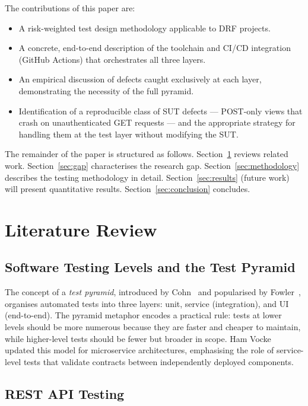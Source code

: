\documentclass[12pt, a4paper]{article}
\begin{document}
The contributions of this paper are:
\begin{itemize}
    \item A risk-weighted test design methodology applicable to DRF projects.
    \item A concrete, end-to-end description of the toolchain and CI/CD
    integration (GitHub Actions) that orchestrates all three layers.
    \item An empirical discussion of defects caught exclusively at each layer,
    demonstrating the necessity of the full pyramid.
    \item Identification of a reproducible class of SUT defects — POST-only
    views that crash on unauthenticated GET requests — and the appropriate
    strategy for handling them at the test layer without modifying the SUT.
\end{itemize}

The remainder of the paper is structured as follows.
Section~\ref{sec:literature} reviews related work.
Section~\ref{sec:gap} characterises the research gap.
Section~\ref{sec:methodology} describes the testing methodology in detail.
Section~\ref{sec:results} (future work) will present quantitative results.
Section~\ref{sec:conclusion} concludes.

\section{Literature Review}
\label{sec:literature}

\subsection{Software Testing Levels and the Test Pyramid}

The concept of a \textit{test pyramid}, introduced by Cohn~\cite{cohn2009} and
popularised by Fowler~\cite{fowler_pyramid}, organises automated tests into
three layers: unit, service (integration), and UI (end-to-end).  The pyramid
metaphor encodes a practical rule: tests at lower levels should be more numerous
because they are faster and cheaper to maintain, while higher-level tests should
be fewer but broader in scope.  Ham
Vocke~\cite{vocke2018} updated this model for microservice architectures,
emphasising the role of service-level tests that validate contracts between
independently deployed components.

\subsection{REST API Testing}
\end{document}
